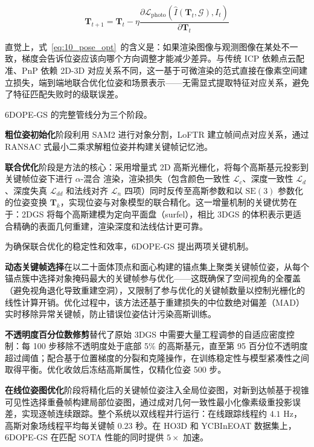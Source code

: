 \begin{equation}
\label{eq:10_pose_opt}
\mathbf{T}_{t+1} = \mathbf{T}_t - \eta \frac{\partial \mathcal{L}_{\text{photo}}(\hat{I}(\mathbf{T}_t, \mathcal{G}), I_t)}{\partial \mathbf{T}_t}
\end{equation}

直觉上，式~\ref{eq:10_pose_opt}~的含义是：如果渲染图像与观测图像在某处不一致，梯度会告诉位姿应该向哪个方向调整才能减少差异。与传统 ICP 依赖点云配准、PnP 依赖 2D-3D 对应关系不同，这一基于可微渲染的范式直接在像素空间建立损失，端到端地联合优化位姿和场景表示——无需显式提取特征对应关系，避免了特征匹配失败时的级联误差。

6DOPE-GS 的完整管线分为三个阶段。

\textbf{粗位姿初始化}阶段利用 SAM2 进行对象分割，LoFTR 建立帧间点对应关系，通过 RANSAC 式最小二乘求解粗位姿并构建关键帧记忆池。

\textbf{联合优化}阶段是方法的核心：采用增量式 2D 高斯光栅化，将每个高斯基元投影到关键帧位姿下进行 $\alpha$-混合 渲染，渲染损失（包含颜色一致性 $\mathcal{L}_c$、深度一致性 $\mathcal{L}_d$、深度失真 $\mathcal{L}_{dd}$ 和法线对齐 $\mathcal{L}_n$ 四项）同时反传至高斯参数和以 $\mathrm{SE}(3)$ 参数化的位姿变换 $\mathbf{T}_k$，实现位姿与对象模型的联合精化。这一增量机制的关键优势在于：2DGS 将每个高斯建模为定向平面盘（surfel），相比 3DGS 的体积表示更适合精确的表面几何重建，渲染深度和法线估计更可靠。

为确保联合优化的稳定性和效率，6DOPE-GS 提出两项关键机制。

\textbf{动态关键帧选择}在以二十面体顶点和面心构建的锚点集上聚类关键帧位姿，从每个锚点簇中选择对象掩码最大的关键帧参与优化——这既确保了空间视角的全覆盖（避免视角退化导致重建空洞），又限制了参与优化的关键帧数量以控制光栅化的线性计算开销。优化过程中，该方法还基于重建损失的中位数绝对偏差（MAD）实时移除异常关键帧，防止错误位姿估计污染高斯训练。

\textbf{不透明度百分位数修剪}替代了原始 3DGS 中需要大量工程调参的自适应密度控制：每 100 步移除不透明度处于底部 5\% 的高斯基元，直至第 95 百分位不透明度超过阈值；配合基于位置梯度的分裂和克隆操作，在训练稳定性与模型紧凑性之间取得平衡。优化收敛后冻结高斯属性，仅精化位姿 500 步。

\textbf{在线位姿图优化}阶段将精化后的关键帧位姿注入全局位姿图，对新到达帧基于视锥可见性选择重叠帧构建局部位姿图，通过成对几何一致性最小化像素级重投影误差，实现逐帧连续跟踪。整个系统以双线程并行运行：在线跟踪线程约 $4.1$ Hz，高斯对象场线程平均每关键帧 $0.23$ 秒。在 HO3D 和 YCBInEOAT 数据集上，6DOPE-GS 在匹配 SOTA 性能的同时提供 $5\times$ 加速。

